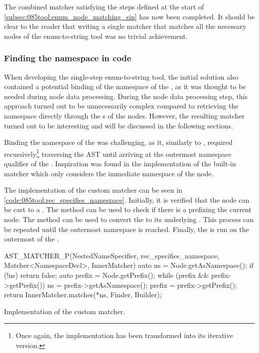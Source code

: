 The combined matcher satisfying the steps defined at the start of \cref{subsec:085tool:enum_node_matching_sin} has now been completed.
It should be clear to the reader that writing a single matcher that matches all the necessary nodes of the enum-to-string tool was no trivial achievement.

\subsubsection*{Finding the namespace in code}
When developing the single-step enum-to-string tool, the initial solution also contained a potential binding of the namespace of the , as it was thought to be needed during node data processing.
During the node data processing step, this approach turned out to be unnecessarily complex compared to retrieving the namespace directly through the s of the nodes.
However, the resulting matcher turned out to be interesting and will be discussed in the following sections.

Binding the namespace of the  was challenging, as it, similarly to , required recursively\footnote{
    Once again, the implementation has been transformed into its iterative version.
}
traversing the AST until arriving at the outermost namespace qualifier of the .
Inspiration was found in the implementation of the built-in  matcher which only considers the immediate namespace of the node.

The implementation of the custom matcher can be seen in \cref{code:085tool:rec_specifies_namespace}. Initially, it is verified that the node can be cast to a .
The method  can be used to check if there is a  prefixing the current node.
The method  can be used to convert the  to its underlying . This process can be repeated until the outermost namespace is reached. 
Finally, the  is run on the outermost  of the .

\begin{listing}[H]
    \begin{cppcode}
AST_MATCHER_P(NestedNameSpecifier, rec_specifies_namespace, Matcher<NamespaceDecl>, InnerMatcher) {
	auto ns = Node.getAsNamespace();
	if (!ns) {
		return false;
	}
	auto prefix = Node.getPrefix();
	while (prefix && prefix->getPrefix()) {
		ns = prefix->getAsNamespace();
		prefix = prefix->getPrefix();
	}
	return InnerMatcher.matches(*ns, Finder, Builder);
}
    \end{cppcode}
    \caption{Implementation of the  custom matcher.}
    \label{code:085tool:rec_specifies_namespace}
\end{listing}

